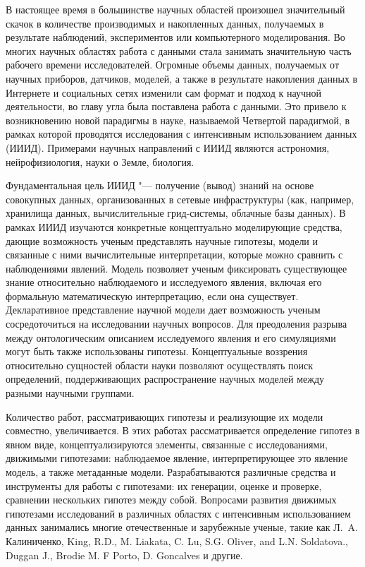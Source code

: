
{\actuality} В настоящее время в большинстве научных областей произошел значительный скачок в количестве производимых 
и накопленных данных, получаемых в результате наблюдений, экспериментов или компьютерного моделирования. Во многих 
научных областях работа с данными стала занимать значительную часть рабочего времени исследователей. Огромные объемы 
данных, получаемых от научных приборов, датчиков, моделей, а также в результате накопления данных в Интернете и 
социальных сетях изменили сам формат и подход к научной деятельности, во главу угла была поставлена работа с данными. 
Это привело к возникновению новой парадигмы в науке, называемой Четвертой парадигмой, в рамках которой проводятся 
исследования с интенсивным использованием данных (ИИИД). Примерами научных направлений с ИИИД являются астрономия, 
нейрофизиология, науки о Земле, биология. 

Фундаментальная цель ИИИД "--- получение (вывод) знаний на основе совокупных данных, организованных в сетевые 
инфраструктуры (как, например, хранилища данных, вычислительные грид-системы, облачные базы данных). В рамках 
ИИИД изучаются конкретные концептуально моделирующие средства, дающие возможность ученым представлять научные 
гипотезы, модели и связанные с ними вычислительные интерпретации, которые можно сравнить с наблюдениями явлений. 
Модель позволяет ученым фиксировать существующее знание относительно наблюдаемого и исследуемого явления, включая 
его формальную математическую интерпретацию, если она существует. Декларативное представление научной модели дает 
возможность ученым сосредоточиться на исследовании научных вопросов. Для преодоления разрыва между онтологическим 
описанием исследуемого явления и его симуляциями могут быть также использованы гипотезы. Концептуальные воззрения 
относительно сущностей области науки позволяют осуществлять поиск определений, поддерживающих распространение 
научных моделей между разными научными группами. 

Количество работ, рассматривающих гипотезы и реализующие их модели совместно, увеличивается. В этих работах 
рассматривается определение гипотез в явном виде, концептуализируются элементы, связанные с исследованиями, 
движимыми гипотезами: наблюдаемое явление, интерпретирующее это явление модель, а также метаданные модели. 
Разрабатываются различные средства и инструменты для работы с гипотезами: их генерации, оценке и проверке, 
сравнении нескольких гипотез между собой. Вопросами развития движимых гипотезами исследований в различных 
областях с интенсивным использованием данных занимались многие отечественные и зарубежные ученые, такие 
как Л.~A. Калиниченко, King, R.D., M. Liakata, C. Lu, S.G. Oliver, and L.N. Soldatova., Duggan J., Brodie M. 
F Porto, D. Goncalves и другие. 

